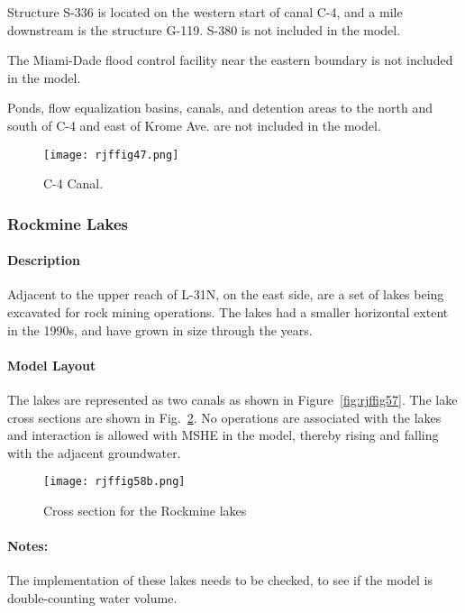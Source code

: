 Structure S-336 is located on the western start of canal C-4, and a mile downstream is the structure G-119. S-380 is not included in the model.

The Miami-Dade flood control facility near the eastern boundary is not included in the model.

Ponds, flow equalization basins, canals, and detention areas to the north and south of C-4 and east of Krome Ave. are not included in the model.

\begin{figure}[!h]
  \begin{center}
  \texttt{[image: rjffig47.png]}
  \caption{C-4 Canal.}
  \label{fig:rjffig47}
  \end{center}
\end{figure}


\clearpage

\subsubsection{Rockmine Lakes}
\paragraph{Description}
Adjacent to the upper reach of L-31N, on the east side, are a set of lakes being excavated for rock mining operations. The lakes had a smaller horizontal extent in the 1990s, and have grown in size through the years.


\paragraph{Model Layout}
The lakes are represented as two canals as shown in Figure~\ref{fig:rjffig57}. The lake cross sections are shown in Fig.~\ref{fig:rjffig58b}. No operations are associated with the lakes and interaction is allowed with MSHE in the model, thereby rising and falling with the adjacent groundwater.

\begin{figure}[!h]
  \begin{center}
  \texttt{[image: rjffig58b.png]}
  \caption{Cross section for the Rockmine lakes}
  \label{fig:rjffig58b}
  \end{center}
\end{figure}

\begin{notes}
\paragraph{Notes:}
The implementation of these lakes needs to be checked, to see if the model is double-counting water volume.
\end{notes}


